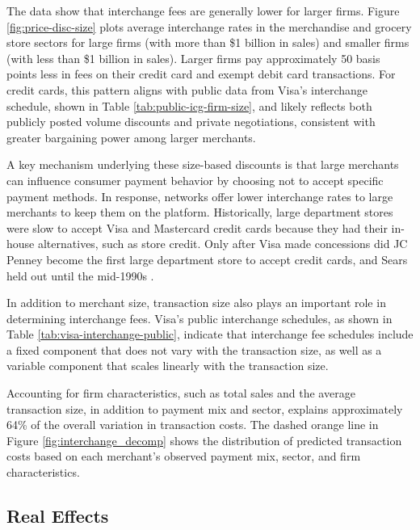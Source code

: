 \documentclass[11pt,english]{article}
\theoremstyle{remark}
\begin{document}
The data show that interchange fees are generally lower for larger firms.
Figure \ref{fig:price-disc-size} plots average interchange rates in the merchandise and grocery store sectors for large firms (with more than \$1 billion in sales) and smaller firms (with less than \$1 billion in sales).
Larger firms pay approximately 50 basis points less in fees on their credit card and exempt debit card transactions.
For credit cards, this pattern aligns with public data from Visa's interchange schedule, shown in Table \ref{tab:public-icg-firm-size}, and likely reflects both publicly posted volume discounts and private negotiations, consistent with greater bargaining power among larger merchants.

A key mechanism underlying these size-based discounts is that large merchants can influence consumer payment behavior by choosing not to accept specific payment methods.
In response, networks offer lower interchange rates to large merchants to keep them on the platform.
Historically, large department stores were slow to accept Visa and Mastercard credit cards because they had their in-house alternatives, such as store credit.
Only after Visa made concessions did JC Penney become the first large department store to accept credit cards, and Sears held out until the mid-1990s \citep{Nocera1995}.

In addition to merchant size, transaction size also plays an important role in determining interchange fees.
Visa's public interchange schedules, as shown in Table \ref{tab:visa-interchange-public}, indicate that interchange fee schedules include a fixed component that does not vary with the transaction size, as well as a variable component that scales linearly with the transaction size.

Accounting for firm characteristics, such as total sales and the average transaction size, in addition to payment mix and sector, explains approximately 64\% of the overall variation in transaction costs.
The dashed orange line in Figure \ref{fig:interchange_decomp} shows the distribution of predicted transaction costs based on each merchant's observed payment mix, sector, and firm characteristics.

\subsection{Real Effects}
\end{document}
